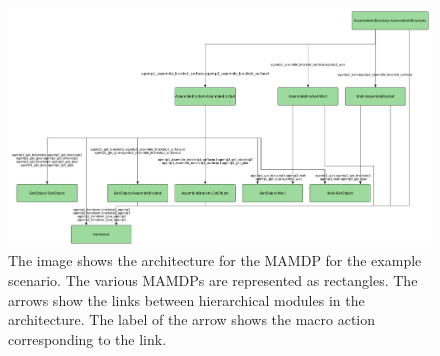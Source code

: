 \begin{figure}
	\centering
	\includegraphics[scale=0.4]{img/coworker/mamdp/scenario_mamdp_architecture.pdf}
	\caption[MAMDP example single MDP]{The image shows the architecture for the MAMDP for the example scenario. The various MAMDPs are represented as rectangles. The arrows show the links between hierarchical modules in the architecture. The label of the arrow shows the macro action corresponding to the link.}
	\label{fig:mamdp-scenario_mamdp_architecture}
\end{figure}



